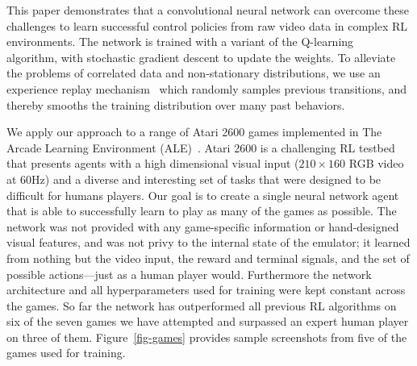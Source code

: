 \documentclass{article} %
\begin{document}

This paper demonstrates that a convolutional neural network can overcome these challenges to learn successful control policies from raw video data in complex RL environments.
The network is trained with a variant of the Q-learning~\cite{watkins-qlearning} algorithm, with stochastic gradient descent to update the weights.
To alleviate the problems of correlated data and non-stationary distributions, we use an experience replay mechanism~\cite{lin1993reinforcement} which randomly samples previous transitions, and thereby smooths the training distribution over many past behaviors.


We apply our approach to a range of Atari 2600 games implemented in The Arcade Learning Environment (ALE)~\cite{bellemare-ale}.
Atari 2600 is a challenging RL testbed that presents agents with a high dimensional visual input ($210 \times 160$ RGB video at 60Hz) and a diverse and interesting set of tasks that were designed to be difficult for humans players.
% 
% 
Our goal is to create a single neural network agent that is able to successfully learn to play as many of the games as possible.
The network was not provided with any game-specific information or hand-designed visual features, and was not privy to the internal state of the emulator; it learned from nothing but the video input, the reward and terminal signals, and the set of possible actions---just as a human player would.
Furthermore the network architecture and all hyperparameters used for training were kept constant across the games.
So far the network has outperformed all previous RL algorithms on six of the seven games we have attempted and surpassed an expert human player on three of them.
Figure~\ref{fig-games} provides sample screenshots from five of the games used for training.
\end{document}
